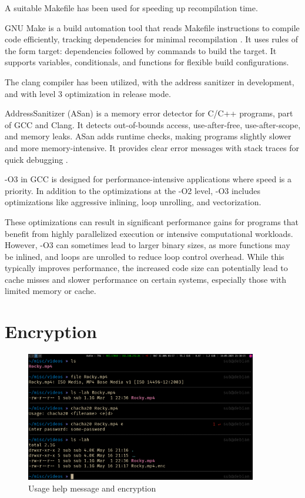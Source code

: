 \documentclass[a4paper,12pt]{report}
\begin{document}
A suitable Makefile has been used for speeding up recompilation time.

GNU Make is a build automation tool that reads Makefile instructions to compile code efficiently, tracking dependencies for minimal recompilation \cite{gnu_make}.
It uses rules of the form target: dependencies followed by commands to build the target.
It supports variables, conditionals, and functions for flexible build configurations.

The clang compiler has been utilized, with the address sanitizer in development, and with level 3 optimization in release mode. \cite{clang_manual}

AddressSanitizer (ASan) is a memory error detector for C/C++ programs, part of GCC and Clang. It detects out-of-bounds access, use-after-free, use-after-scope, and memory leaks.
ASan adds runtime checks, making programs slightly slower and more memory-intensive. It provides clear error messages with stack traces for quick debugging \cite{clang_address_sanitizer}.

-O3 in GCC is designed for performance-intensive applications where speed is a priority.
In addition to the optimizations at the -O2 level, -O3 includes optimizations like aggressive inlining, loop unrolling, and vectorization.

These optimizations can result in significant performance gains for programs that benefit from highly parallelized execution or intensive computational workloads.
However, -O3 can sometimes lead to larger binary sizes, as more functions may be inlined, and loops are unrolled to reduce loop control overhead. While this typically improves performance, the increased code size can potentially lead to cache misses and slower performance on certain systems, especially those with limited memory or cache.

\section{Encryption}
\begin{figure}[h]
	\centering
	\includegraphics[width=0.9\textwidth]{../assets/2_encryption.png}
        \caption{Usage help message and encryption}
	\label{image}
\end{figure}
\end{document}

